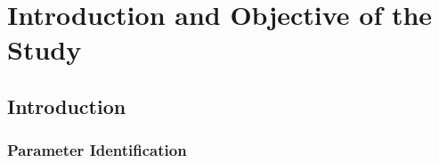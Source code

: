 \chapter{Introduction and Objective of the Study}

\section{Introduction}\label{sec:Introduction}

\subsection{Parameter Identification}

